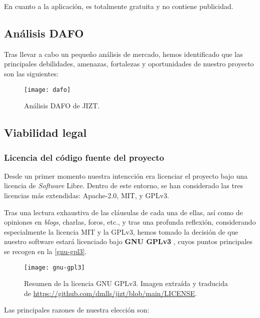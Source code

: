 En cuanto a la aplicación, es totalmente gratuita y no contiene publicidad.

\newpage
\subsection{Análisis DAFO}

Tras llevar a cabo un pequeño análisis de mercado, hemos identificado que las principales debilidades, amenazas, fortalezas y oportunidades de nuestro proyecto son las siguientes:

\begin{figure}[h]
	\centering
	\texttt{[image: dafo]}
	\vspace{-0.5cm}
	\caption{Análisis DAFO de JIZT.}
\end{figure}

\subsection{Viabilidad legal}

\subsubsection{Licencia del código fuente del proyecto}

Desde un primer momento nuestra intencción era licenciar el proyecto bajo una licencia de \emph{Software} Libre. Dentro de este entorno, se han considerado las tres licencias más extendidas: Apache-2.0, MIT, y GPLv3.

Tras una lectura exhaustiva de las cláusulas de cada una de ellas, así como de opiniones en \emph{blogs}, charlas, foros, etc., y tras una profunda reflexión, considerando especialmente la licencia MIT y la GPLv3, hemos tomado la decisión de que nuestro software estará licenciado bajo \textbf{GNU GPLv3} \cite{gplv3}, cuyos puntos principales se recogen en la \autoref{gnu-gpl3}.

\begin{figure}[h]
	\centering
	\texttt{[image: gnu-gpl3]}
	\vspace{-0.5cm}
	\caption[Resumen de la licencia GNU GPLv3]{Resumen de la licencia GNU GPLv3. Imagen extraída y traducida de \href{https://github.com/dmlls/jizt/blob/main/LICENSE}{https://github.com/dmlls/jizt/blob/main/LICENSE}.}
	\label{gnu-gpl3}
\end{figure}

Las principales razones de nuestra elección son:

